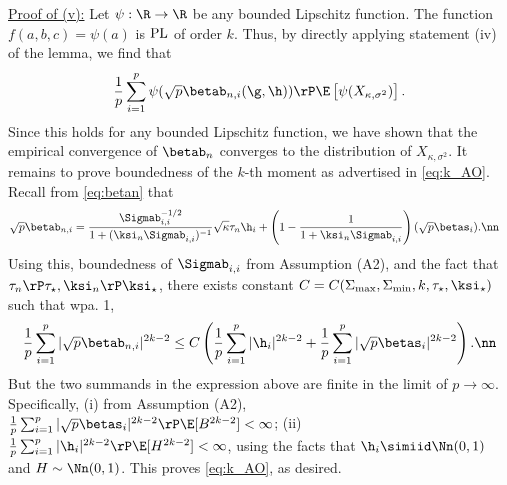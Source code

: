 \vspace{5pt}
\vp\noindent\underline{Proof of (v):} Let $\psi:\R\rightarrow\R$ be any bounded Lipschitz function. The function $f(a,b,c) = \psi(a)$ is $\rm{PL}$ of order $k$. Thus, by directly applying statement (iv) of the lemma, we find that
$$
\frac{1}{p}\sum_{i=1}^p{\psi(\sqrt{p}\betab_{n,i}(\g,\h))} \rP \E\left[\psi(X_{\kappa,\sigma^2})\right].
$$
Since this holds for any bounded Lipschitz function, we have shown that the empirical convergence of $\betab_n$ converges to the distribution of $X_{\kappa,\sigma^2}$. It remains to prove boundedness of the $k$-th moment as advertised in \eqref{eq:k_AO}. Recall  from
\eqref{eq:betan} that
\begin{align}
\sqrt{p}\betab_{n,i}&=\frac{{\Sigmab_{i,i}^{-1/2}}}{1+(\ksi_n\Sigmab_{i,i})^{-1}}\sqrt{\kappa}\tau_n\h_i +\left(1-\frac{1}{1+\ksi_n\Sigmab_{i,i}}\right)(\sqrt{p}\betas_i).\nn
\end{align}
Using this, boundedness of $\Sigmab_{i,i}$ from Assumption (A2), and the fact that $\tau_n\rP\tau_\star, \ksi_n\rP\ksi_\star$, there exists constant $C=C(\Sigma_{\max},\Sigma_{\min},k,\tau_\star,\ksi_\star)$ such that wpa. 1,
\begin{align}
\frac{1}{p}\sum_{i=1}^p|\sqrt{p}\betab_{n,i}|^{2k-2} \leq C\left(\frac{1}{p}\sum_{i=1}^p|\h_{i}|^{2k-2}+\frac{1}{p}\sum_{i=1}^p|\sqrt{p}\betas_{i}|^{2k-2}\right).\nn
\end{align}
But the two summands in the expression above are finite in the limit of $p\rightarrow\infty$. Specifically, (i) from Assumption (A2), $\frac{1}{p}\sum_{i=1}^p|\sqrt{p}\betas_{i}|^{2k-2}\rP\E[B^{2k-2}]<\infty$; (ii) $\frac{1}{p}\sum_{i=1}^p|\h_{i}|^{2k-2}\rP\E[H^{2k-2}]<\infty$, using the facts that $\h_i\simiid\Nn(0,1)$ and $H\sim\Nn(0,1)$. This proves \eqref{eq:k_AO}, as desired.


